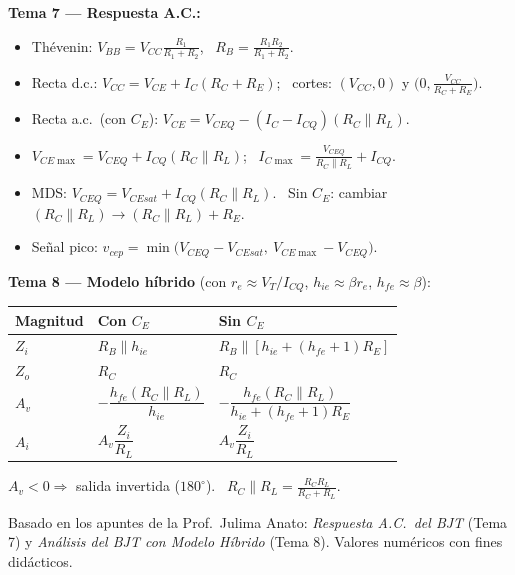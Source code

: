 \documentclass[11pt,a4paper]{article}
\begin{document}
\begin{cajaRecuerda}
\textbf{Tema 7 --- Respuesta A.C.:}
\begin{itemize}[leftmargin=1.2em,itemsep=2pt]
  \item Thévenin: $V_{BB}=V_{CC}\frac{R_1}{R_1+R_2}$, \ $R_B=\frac{R_1R_2}{R_1+R_2}$.
  \item Recta d.c.: $V_{CC}=V_{CE}+I_C(R_C+R_E)$; \ cortes: $(V_{CC},0)$ y $\bigl(0,\frac{V_{CC}}{R_C+R_E}\bigr)$.
  \item Recta a.c.\ (con $C_E$): $V_{CE}=V_{CEQ}-(I_C-I_{CQ})(R_C\parallel R_L)$.
  \item $V_{CE\max}=V_{CEQ}+I_{CQ}(R_C\parallel R_L)$; \ $I_{C\max}=\frac{V_{CEQ}}{R_C\parallel R_L}+I_{CQ}$.
  \item MDS: $V_{CEQ}=V_{CEsat}+I_{CQ}(R_C\parallel R_L)$. \ Sin $C_E$: cambiar $(R_C\parallel R_L)\to(R_C\parallel R_L)+R_E$.
  \item Señal pico: $v_{cep}=\min\bigl(V_{CEQ}-V_{CEsat},\ V_{CE\max}-V_{CEQ}\bigr)$.
\end{itemize}
\end{cajaRecuerda}

\begin{cajaRecuerda}
\textbf{Tema 8 --- Modelo híbrido} (con $r_e\approx V_T/I_{CQ}$, $h_{ie}\approx\beta r_e$, $h_{fe}\approx\beta$):
\begin{center}
\begin{tabularx}{0.95\linewidth}{@{} l >{\centering\arraybackslash}X >{\centering\arraybackslash}X @{}}
\toprule
\textbf{Magnitud} & \textbf{Con $C_E$} & \textbf{Sin $C_E$} \\
\midrule
$Z_i$ & $R_B\parallel h_{ie}$ & $R_B\parallel[h_{ie}+(h_{fe}+1)R_E]$ \\
$Z_o$ & $R_C$ & $R_C$ \\
$A_v$ & $-\dfrac{h_{fe}(R_C\parallel R_L)}{h_{ie}}$ & $-\dfrac{h_{fe}(R_C\parallel R_L)}{h_{ie}+(h_{fe}+1)R_E}$ \\
$A_i$ & $A_v\dfrac{Z_i}{R_L}$ & $A_v\dfrac{Z_i}{R_L}$ \\
\bottomrule
\end{tabularx}
\end{center}
$A_v<0\Rightarrow$ salida invertida ($180^\circ$). \ $R_C\parallel R_L=\frac{R_CR_L}{R_C+R_L}$.
\end{cajaRecuerda}

\vspace{6pt}
\begin{center}
\footnotesize\color{grisTexto}
Basado en los apuntes de la Prof.\ Julima Anato: \emph{Respuesta A.C.\ del BJT} (Tema 7) y \emph{Análisis del BJT con Modelo Híbrido} (Tema 8). Valores numéricos con fines didácticos.
\end{center}
\end{document}
